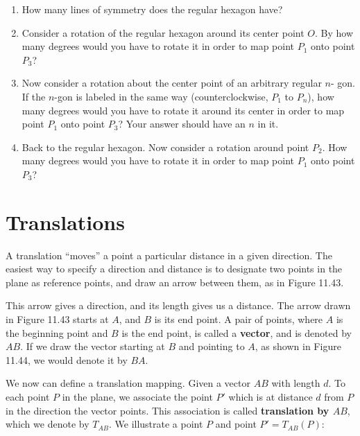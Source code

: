 \documentclass[12pt]{book} %
\begin{document}
\begin{ExerciseList}
\begin{ExerciseList}
\Exercise
\begin{enumerate}
\item[(a)] How many lines of symmetry does the regular hexagon have?
\item[(b)] Consider a rotation of the regular hexagon around its center point $O$. By
how many degrees would you have to rotate it in order to map point $P_1$
onto point $P_3$?
\item[(c)] Now consider a rotation about the center point of an arbitrary regular $n$-
gon. If the $n$-gon is labeled in the same way (counterclockwise, $P_1$ to $P_n$),
how many degrees would you have to rotate it around its center in order
to map point $P_1$ onto point $P_3$? Your answer should have an $n$ in it.
\item[(d)] Back to the regular hexagon. Now consider a rotation around point $P_2$.
How many degrees would you have to rotate it in order to map point $P_1$
onto point $P_3$?
\end{enumerate}


\end{ExerciseList}

\section{Translations}

A translation ``moves'' a point a particular distance in a given direction.
The easiest way to specify a direction and distance is to designate two
points in the plane as reference points, and draw an arrow between
them, as in Figure 11.43.


This arrow gives a direction, and its length gives us a distance. The arrow drawn in Figure 11.43 starts at $A$, and $B$ is its end point. A pair of
points, where $A$ is the beginning point and $B$ is the end point, is called a
\textbf{vector}, and is denoted by $AB$. If we draw the vector starting at $B$ and
pointing to $A$, as shown in Figure 11.44, we would denote it by $BA$.


We now can define a translation mapping. Given a vector $AB$ with
length $d$. To each point $P$ in the plane, we associate the point $P'$ which
is at distance $d$ from $P$ in the direction the vector points. This association is called \textbf{translation by $AB$}, which we denote by $T_{AB}$. We illustrate a
point $P$ and point $P'=T_{AB}(P)$:


\end{ExerciseList}
\end{document}
